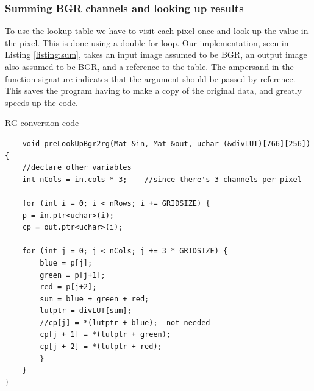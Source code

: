 \subsubsection{Summing BGR channels and looking up results}
To use the lookup table we have to visit each pixel once and look up the value in the pixel. This is done using a double for loop. Our implementation, seen in Listing \ref{listing:sum}, takes an input image assumed to be BGR, an output image also assumed to be BGR, and a reference to the table. The ampersand \codeword{&} in the function signature indicates that the argument should be passed by reference. This saves the program having to make a copy of the original data, and greatly speeds up the code.
\begin{listing}[H]
	\caption{RG conversion code}
	\label{listing:sum}
	\begin{verbatim}
	void preLookUpBgr2rg(Mat &in, Mat &out, uchar (&divLUT)[766][256]) {
	//declare other variables
	int nCols = in.cols * 3;	//since there's 3 channels per pixel
	
	for (int i = 0; i < nRows; i += GRIDSIZE) {
	p = in.ptr<uchar>(i);
	cp = out.ptr<uchar>(i);
	
	for (int j = 0; j < nCols; j += 3 * GRIDSIZE) {
		blue = p[j];
		green = p[j+1];
		red = p[j+2];
		sum = blue + green + red;
		lutptr = divLUT[sum];
		//cp[j] = *(lutptr + blue);  not needed
		cp[j + 1] = *(lutptr + green);
		cp[j + 2] = *(lutptr + red);
		}
	}
}
	\end{verbatim}
\end{listing}
